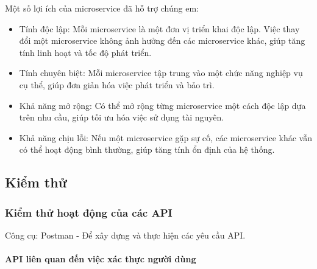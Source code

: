 Một số lợi ích của microservice đã hỗ trợ chúng em:
\begin{itemize}
  \item Tính độc lập: Mỗi microservice là một đơn vị triển khai độc lập. Việc thay đổi một microservice không ảnh hưởng đến các microservice khác, giúp tăng tính linh hoạt và tốc độ phát triển.
  \item Tính chuyên biệt: Mỗi microservice tập trung vào một chức năng nghiệp vụ cụ thể, giúp đơn giản hóa việc phát triển và bảo trì.
  \item Khả năng mở rộng: Có thể mở rộng từng microservice một cách độc lập dựa trên nhu cầu, giúp tối ưu hóa việc sử dụng tài nguyên.
  \item Khả năng chịu lỗi: Nếu một microservice gặp sự cố, các microservice khác vẫn có thể hoạt động bình thường, giúp tăng tính ổn định của hệ thống.
\end{itemize}

\subsection{Kiểm thử}

\subsubsection{Kiểm thử hoạt động của các API}




Công cụ: Postman - Để xây dựng và thực hiện các yêu cầu API.

\paragraph{API liên quan đến việc xác thực người dùng}
\mbox{}



